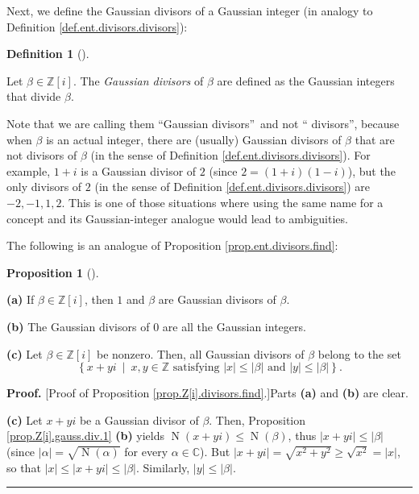 \documentclass[numbers=enddot,12pt,final,onecolumn,notitlepage]{scrartcl}%
\numberwithin{exer}{subsection}
\theoremstyle{definition}
\newtheorem{prop}[theo]{Proposition}
\newenvironment{proposition}[1][]
{\begin{prop}[#1]\begin{leftbar}}
{\end{leftbar}\end{prop}}
\newtheorem{defi}[theo]{Definition}
\newenvironment{definition}[1][]
{\begin{defi}[#1]\begin{leftbar}}
{\end{leftbar}\end{defi}}
\newenvironment{proof}[1][Proof]{\noindent\textbf{#1.} }{\ \rule{0.5em}{0.5em}}
\begin{document}
Next, we define the Gaussian divisors of a Gaussian integer (in analogy to
Definition \ref{def.ent.divisors.divisors}):

\begin{definition}
\label{def.Z[i].divisors.divisors}Let $\beta\in\mathbb{Z}\left[  i\right]  $.
The \textit{Gaussian divisors} of $\beta$ are defined as the Gaussian integers
that divide $\beta$.
\end{definition}

Note that we are calling them \textquotedblleft Gaussian
divisors\textquotedblright\ and not \textquotedblleft
divisors\textquotedblright, because when $\beta$ is an actual integer, there
are (usually) Gaussian divisors of $\beta$ that are not divisors of $\beta$
(in the sense of Definition \ref{def.ent.divisors.divisors}). For example,
$1+i$ is a Gaussian divisor of $2$ (since $2=\left(  1+i\right)  \left(
1-i\right)  $), but the only divisors of $2$ (in the sense of Definition
\ref{def.ent.divisors.divisors}) are $-2,-1,1,2$. This is one of those
situations where using the same name for a concept and its Gaussian-integer
analogue would lead to ambiguities.

The following is an analogue of Proposition \ref{prop.ent.divisors.find}:

\begin{proposition}
\label{prop.Z[i].divisors.find}\textbf{(a)} If $\beta\in\mathbb{Z}\left[
i\right]  $, then $1$ and $\beta$ are Gaussian divisors of $\beta$.

\textbf{(b)} The Gaussian divisors of $0$ are all the Gaussian integers.

\textbf{(c)} Let $\beta\in\mathbb{Z}\left[  i\right]  $ be nonzero. Then, all
Gaussian divisors of $\beta$ belong to the set%
\[
\left\{  x+yi\ \mid\ x,y\in\mathbb{Z}\text{ satisfying }\left\vert
x\right\vert \leq\left\vert \beta\right\vert \text{ and }\left\vert
y\right\vert \leq\left\vert \beta\right\vert \right\}  .
\]

\end{proposition}

\begin{proof}
[Proof of Proposition \ref{prop.Z[i].divisors.find}.]Parts \textbf{(a)} and
\textbf{(b)} are clear.

\textbf{(c)} Let $x+yi$ be a Gaussian divisor of $\beta$. Then, Proposition
\ref{prop.Z[i].gauss.div.1} \textbf{(b)} yields $\operatorname*{N}\left(
x+yi\right)  \leq\operatorname*{N}\left(  \beta\right)  $, thus $\left\vert
x+yi\right\vert \leq\left\vert \beta\right\vert $ (since $\left\vert
\alpha\right\vert =\sqrt{\operatorname*{N}\left(  \alpha\right)  }$ for every
$\alpha\in\mathbb{C}$). But $\left\vert x+yi\right\vert =\sqrt{x^{2}+y^{2}%
}\geq\sqrt{x^{2}}=\left\vert x\right\vert $, so that $\left\vert x\right\vert
\leq\left\vert x+yi\right\vert \leq\left\vert \beta\right\vert $. Similarly,
$\left\vert y\right\vert \leq\left\vert \beta\right\vert $.
\end{proof}
\end{document}
